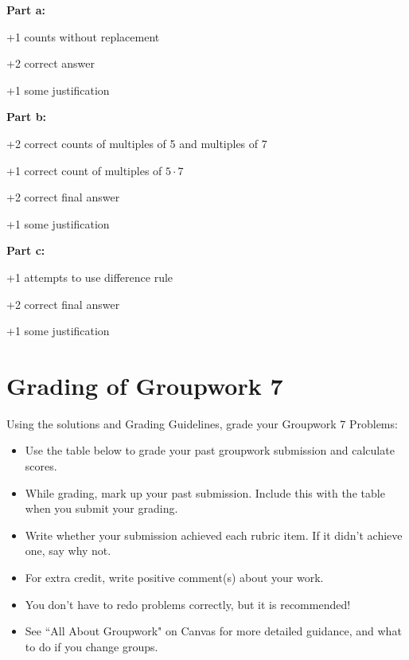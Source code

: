 \documentclass[12pt]{exam}
\newcommand{\prevhwnum}{7}
\begin{document}
\begin{solution}
\textbf{Part a:}
\begin{guidelines}
    \item +1 counts without replacement
    \item +2 correct answer
    \item +1 some justification
\end{guidelines}
\textbf{Part b:}
\begin{guidelines}
    \item +2 correct counts of multiples of 5 and multiples of 7
    \item +1 correct count of multiples of $5\cdot 7$
    \item +2 correct final answer
    \item +1 some justification
\end{guidelines}
\textbf{Part c:}
\begin{guidelines}
    \item +1 attempts to use difference rule
    \item +2 correct final answer
    \item +1 some justification
\end{guidelines}
\end{solution}

\pagebreak
\section*{Grading of Groupwork \prevhwnum{}}
Using the solutions and Grading Guidelines, grade your Groupwork \prevhwnum{} Problems:
\begin{itemize}
    \item Use the table below to grade your past groupwork submission and calculate scores.
    \item While grading, mark up your past submission. Include this with the table when you submit your grading.
    \item Write whether your submission achieved each rubric item. If it didn't achieve one, say why not.
    \item For extra credit, write positive comment(s) about your work.
    \item You don't have to redo problems correctly, but it is recommended!
    \item See ``All About Groupwork" on Canvas for more detailed guidance, and what to do if you change groups.
\end{itemize}
\end{document}
